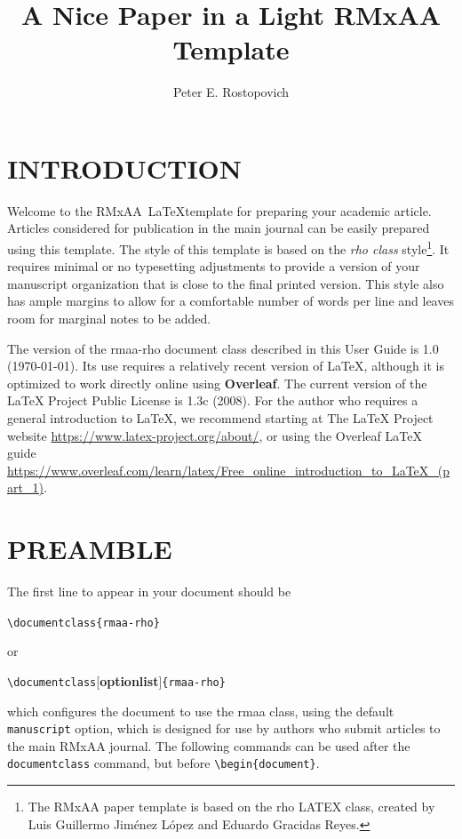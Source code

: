\documentclass[9pt,twoside]{rmaa-rho-class/rmaa-rho_light}
\title{A Nice Paper in a Light RMxAA Template}
\author[1,$\dagger$]{Peter E. Rostopovich \orcidlink{0000-0009-8765-4321}}
\affil[1]{State University of Malcrovia, Republic of Happyland}
\newcommand\rmaatex{RMxAA~\LaTeX}
\newcommand{\CS}[1]{\texttt{\textbackslash #1}}
\begin{document}
\maketitle
\pagestyle{fancy}\thispagestyle{firststyle}


\section{INTRODUCTION}

    Welcome to the \rmaatex template for preparing your academic article. Articles considered for publication in the main journal can be easily prepared using this template. The style of this template is based on the \textit{rho class} style\footnote{The RMxAA paper template is based on the rho LATEX class,
created by Luis Guillermo Jiménez López and Eduardo Gracidas Reyes.}. It requires minimal or no typesetting adjustments to provide a version of your manuscript organization that is close to the final printed version. This style also has ample margins to allow for a comfortable number of words per line and leaves room for marginal notes to be added.

    The version of the rmaa-rho document class described in this User Guide is 1.0 (\today). Its use requires a relatively recent version of \LaTeX{}, although it is optimized to work directly online using \textbf{Overleaf}. The current version of the \LaTeX{} Project Public License is 1.3c (2008).  For the author who requires a general introduction to \LaTeX{}, we recommend starting at The LaTeX Project website \url{https://www.latex-project.org/about/}, or using the Overleaf LaTeX guide \url{https://www.overleaf.com/learn/latex/Free_online_introduction_to_LaTeX_(part_1)}. 

\section{PREAMBLE}

    The first line to appear in your document should be 

    \bigskip
    \CS{documentclass}\verb+{rmaa-rho}+
    
    \bigskip
    or
    
    \bigskip
    \CS{documentclass}[\textbf{optionlist}]\verb+{rmaa-rho}+
    
    \bigskip
    \noindent which configures the document to use the rmaa class, using the default \texttt{manuscript} option, which is designed for use by authors who submit articles to the main RMxAA journal. The following commands can be used after the \verb|documentclass| command, but before \verb|\begin{document}|.
\end{document}
